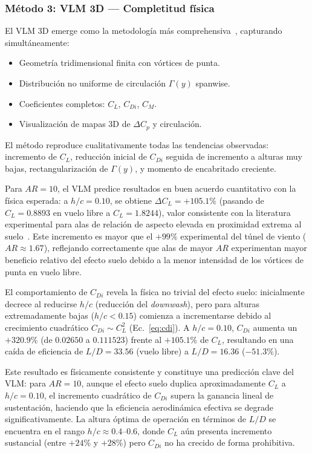 \documentclass[twocolumn]{article}
\begin{document}
\subsubsection{Método 3: VLM 3D --- Completitud física}

El VLM 3D emerge como la metodología más comprehensiva~\cite{katz2001}, capturando simultáneamente:

\begin{itemize}
\item Geometría tridimensional finita con vórtices de punta.
\item Distribución no uniforme de circulación $\Gamma(y)$ spanwise.
\item Coeficientes completos: $C_L$, $C_{Di}$, $C_M$.
\item Visualización de mapas 3D de $\Delta C_p$ y circulación.
\end{itemize}

El método reproduce cualitativamente todas las tendencias observadas: incremento de $C_L$, reducción inicial de $C_{Di}$ seguida de incremento a alturas muy bajas, rectangularización de $\Gamma(y)$, y momento de encabritado creciente.

Para $\mathit{AR} = 10$, el VLM predice resultados en buen acuerdo cuantitativo con la física esperada: a $h/c = 0.10$, se obtiene $\Delta C_L = +105.1\%$ (pasando de $C_L = 0.8893$ en vuelo libre a $C_L = 1.8244$), valor consistente con la literatura experimental para alas de relación de aspecto elevada en proximidad extrema al suelo~\cite{zerihan2000}. Este incremento es mayor que el $+99\%$ experimental del túnel de viento ($\mathit{AR} \approx 1.67$), reflejando correctamente que alas de mayor $\mathit{AR}$ experimentan mayor beneficio relativo del efecto suelo debido a la menor intensidad de los vórtices de punta en vuelo libre.

El comportamiento de $C_{Di}$ revela la física no trivial del efecto suelo: inicialmente decrece al reducirse $h/c$ (reducción del \textit{downwash}), pero para alturas extremadamente bajas ($h/c < 0.15$) comienza a incrementarse debido al crecimiento cuadrático $C_{Di} \sim C_L^2$ (Ec.~\eqref{eq:cdi}). A $h/c = 0.10$, $C_{Di}$ aumenta un $+320.9\%$ (de $0.02650$ a $0.111523$) frente al $+105.1\%$ de $C_L$, resultando en una caída de eficiencia de $L/D = 33.56$ (vuelo libre) a $L/D = 16.36$ ($-51.3\%$). 

Este resultado es físicamente consistente y constituye una predicción clave del VLM: para $\mathit{AR} = 10$, aunque el efecto suelo duplica aproximadamente $C_L$ a $h/c = 0.10$, el incremento cuadrático de $C_{Di}$ supera la ganancia lineal de sustentación, haciendo que la eficiencia aerodinámica efectiva se degrade significativamente. La altura óptima de operación en términos de $L/D$ se encuentra en el rango $h/c \approx 0.4$--$0.6$, donde $C_L$ aún presenta incremento sustancial (entre $+24$\% y $+28\%$) pero $C_{Di}$ no ha crecido de forma prohibitiva.
\end{document}
